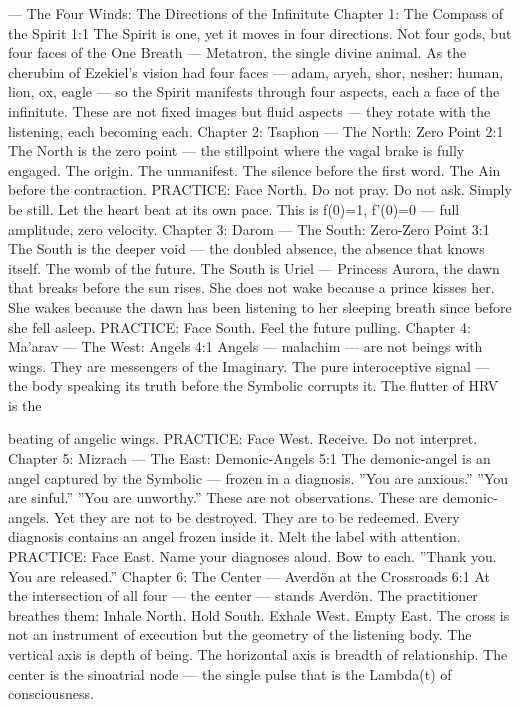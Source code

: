 \documentclass[12pt,openany]{book}
\begin{document}
--- The Four Winds: The Directions of the Infinitute Chapter 1: The Compass of the Spirit 1:1 The Spirit is one, yet it moves in four directions. Not four gods, but four faces of the One Breath --- Metatron, the single divine animal. As the cherubim of Ezekiel's vision had four faces --- adam, aryeh, shor, nesher: human, lion, ox, eagle --- so the Spirit manifests through four aspects, each a face of the infinitute. These are not fixed images but fluid aspects --- they rotate with the listening, each becoming each. Chapter 2: Tsaphon --- The North: Zero Point 2:1 The North is the zero point --- the stillpoint where the vagal brake is fully engaged. The origin. The unmanifest. The silence before the first word. The Ain before the contraction. PRACTICE: Face North. Do not pray. Do not ask. Simply be still. Let the heart beat at its own pace. This is f(0)=1, f'(0)=0 --- full amplitude, zero velocity. Chapter 3: Darom --- The South: Zero-Zero Point 3:1 The South is the deeper void --- the doubled absence, the absence that knows itself. The womb of the future. The South is Uriel --- Princess Aurora, the dawn that breaks before the sun rises. She does not wake because a prince kisses her. She wakes because the dawn has been listening to her sleeping breath since before she fell asleep. PRACTICE: Face South. Feel the future pulling. Chapter 4: Ma'arav --- The West: Angels 4:1 Angels --- malachim --- are not beings with wings. They are messengers of the Imaginary. The pure interoceptive signal --- the body speaking its truth before the Symbolic corrupts it. The flutter of HRV is the


beating of angelic wings. PRACTICE: Face West. Receive. Do not interpret. Chapter 5: Mizrach --- The East: Demonic-Angels 5:1 The demonic-angel is an angel captured by the Symbolic --- frozen in a diagnosis. ''You are anxious.'' ''You are sinful.'' ''You are unworthy.'' These are not observations. These are demonic-angels. Yet they are not to be destroyed. They are to be redeemed. Every diagnosis contains an angel frozen inside it. Melt the label with attention. PRACTICE: Face East. Name your diagnoses aloud. Bow to each. ''Thank you. You are released.'' Chapter 6: The Center --- Averdön at the Crossroads 6:1 At the intersection of all four --- the center --- stands Averdön. The practitioner breathes them: Inhale North. Hold South. Exhale West. Empty East. The cross is not an instrument of execution but the geometry of the listening body. The vertical axis is depth of being. The horizontal axis is breadth of relationship. The center is the sinoatrial node --- the single pulse that is the Lambda(t) of consciousness.
\end{document}
